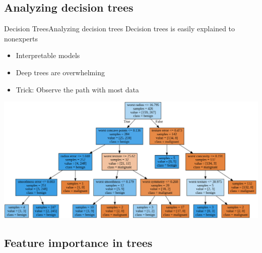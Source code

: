 \documentclass[10pt,compress]{beamer} %
\begin{document}
\subsection{Analyzing decision trees}

\begin{frame}{Decision Trees}{Analyzing decision trees}
    Decision trees is easily explained to nonexperts
    \begin{itemize}
        \item Interpretable models
        \item Deep trees are overwhelming
        \item Trick: Observe the path with most data
    \end{itemize}

    \centering \includegraphics[width=\linewidth]{figs/tree-cancer.png}
\end{frame}

\subsection{Feature importance in trees}
\end{document}

